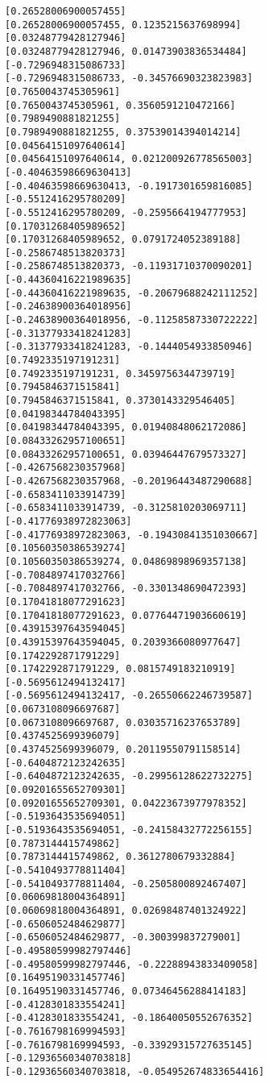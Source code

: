 \documentclass[11pt]{article}
\begin{document}
\begin{Verbatim}[commandchars=\\\{\}]
[0.26528006900057455]
[0.26528006900057455, 0.1235215637698994]
[0.03248779428127946]
[0.03248779428127946, 0.01473903836534484]
[-0.7296948315086733]
[-0.7296948315086733, -0.34576690323823983]
[0.7650043745305961]
[0.7650043745305961, 0.3560591210472166]
[0.7989490881821255]
[0.7989490881821255, 0.37539014394014214]
[0.04564151097640614]
[0.04564151097640614, 0.021200926778565003]
[-0.40463598669630413]
[-0.40463598669630413, -0.1917301659816085]
[-0.5512416295780209]
[-0.5512416295780209, -0.2595664194777953]
[0.17031268405989652]
[0.17031268405989652, 0.0791724052389188]
[-0.2586748513820373]
[-0.2586748513820373, -0.11931710370090201]
[-0.44360416221989635]
[-0.44360416221989635, -0.20679688242111252]
[-0.24638900364018956]
[-0.24638900364018956, -0.11258587330722222]
[-0.31377933418241283]
[-0.31377933418241283, -0.1444054933850946]
[0.7492335197191231]
[0.7492335197191231, 0.3459756344739719]
[0.7945846371515841]
[0.7945846371515841, 0.3730143329546405]
[0.04198344784043395]
[0.04198344784043395, 0.01940848062172086]
[0.08433262957100651]
[0.08433262957100651, 0.03946447679573327]
[-0.4267568230357968]
[-0.4267568230357968, -0.20196443487290688]
[-0.6583411033914739]
[-0.6583411033914739, -0.3125810203069711]
[-0.41776938972823063]
[-0.41776938972823063, -0.19430841351030667]
[0.10560350386539274]
[0.10560350386539274, 0.04869898969357138]
[-0.7084897417032766]
[-0.7084897417032766, -0.3301348690472393]
[0.17041818077291623]
[0.17041818077291623, 0.07764471903660619]
[0.43915397643594045]
[0.43915397643594045, 0.2039366080977647]
[0.1742292871791229]
[0.1742292871791229, 0.0815749183210919]
[-0.5695612494132417]
[-0.5695612494132417, -0.26550662246739587]
[0.0673108096697687]
[0.0673108096697687, 0.03035716237653789]
[0.4374525699396079]
[0.4374525699396079, 0.20119550791158514]
[-0.6404872123242635]
[-0.6404872123242635, -0.29956128622732275]
[0.09201655652709301]
[0.09201655652709301, 0.04223673977978352]
[-0.5193643535694051]
[-0.5193643535694051, -0.24158432772256155]
[0.7873144415749862]
[0.7873144415749862, 0.3612780679332884]
[-0.5410493778811404]
[-0.5410493778811404, -0.2505800892467407]
[0.06069818004364891]
[0.06069818004364891, 0.02698487401324922]
[-0.6506052484629877]
[-0.6506052484629877, -0.300399837279001]
[-0.49580599982797446]
[-0.49580599982797446, -0.22288943833409058]
[0.16495190331457746]
[0.16495190331457746, 0.07346456288414183]
[-0.4128301833554241]
[-0.4128301833554241, -0.18640050552676352]
[-0.7616798169994593]
[-0.7616798169994593, -0.33929315727635145]
[-0.12936560340703818]
[-0.12936560340703818, -0.054952674833654416]

\end{Verbatim}
\end{document}
